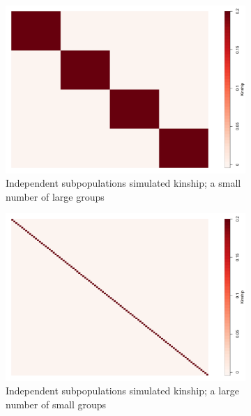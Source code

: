 


\begin{figure}[H]
\begin{subfigure}{.8\textwidth}
  \centering
  \includegraphics[width=.7\linewidth]{figures/kinship1}  
  \caption{Independent subpopulations simulated kinship; a small number of large groups}
  \label{fig:large_groups}
\end{subfigure}
\newline
\begin{subfigure}{.8\textwidth}
  \centering
  \includegraphics[width=.7\linewidth]{figures/kinship2}  
  \caption{Independent subpopulations simulated kinship; a large number of small groups}
  \label{fig:small_groups}
\end{subfigure}
\newline
\begin{subfigure}{.8\textwidth}

\end{subfigure}
\end{figure}
